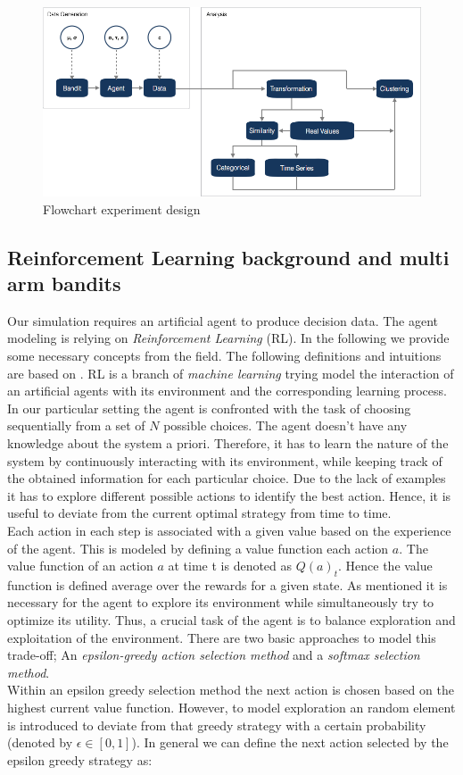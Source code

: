 \documentclass[12pt,a4paper,bibliography=totocnumbered,listof=totocnumbered]{scrartcl}
\begin{document}
 \begin{figure}[H]
	\includegraphics[width=\textwidth]{Pictures/flow01.png}
	\caption{Flowchart experiment design}
	\label{fig:flow}
\end{figure}

\subsection{Reinforcement Learning background and multi arm bandits}
\label{reinf}
Our simulation requires an artificial agent to produce decision data. The agent modeling is relying on \textit{Reinforcement Learning} (RL). In the following we provide some necessary concepts from the field. The following definitions and intuitions are based on \cite{Sutton2012}. RL is a branch of \textit{machine learning} trying model the interaction of an artificial agents with its environment and the corresponding learning process. \\
In our particular setting the agent is confronted with the task of choosing sequentially from a set of $N$ possible choices. The agent doesn't have any knowledge about the system a priori. Therefore, it has to learn the nature of the system by continuously interacting with its environment, while keeping track of the obtained information for each particular choice. Due to the lack of examples it has to explore different possible actions to identify the best action. Hence, it is useful to deviate from the current optimal strategy from time to time.\\ 
Each action in each step is associated with a given value based on the experience of the agent. This is modeled by defining a value function each action $a$. The value function of an action $a$ at time t is denoted as $Q(a)_t$. Hence the value function is defined average over the rewards for a given state. As mentioned it is necessary for the agent to explore its environment while simultaneously try to optimize its utility. Thus, a crucial task of the agent is to balance exploration and exploitation of the environment. There are two basic approaches to model this trade-off; An \textit{epsilon-greedy action selection method} and a \textit{softmax selection method}.\\
Within an epsilon greedy  selection method the next action is chosen based on the highest current value function. However, to model exploration an random element is introduced to deviate from that greedy strategy with a certain probability (denoted by $\epsilon \in [0,1]$). In general we can define the next action selected by the epsilon greedy strategy as:
\end{document}
